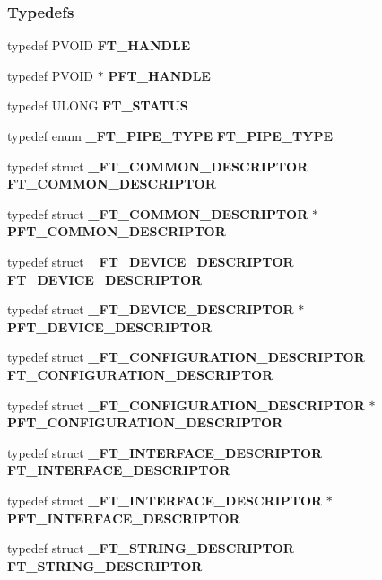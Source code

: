 \subsubsection*{Typedefs}
\begin{DoxyCompactItemize}
\item 
typedef P\+V\+O\+ID {\bf F\+T\+\_\+\+H\+A\+N\+D\+LE}
\item 
typedef P\+V\+O\+ID $\ast$ {\bf P\+F\+T\+\_\+\+H\+A\+N\+D\+LE}
\item 
typedef U\+L\+O\+NG {\bf F\+T\+\_\+\+S\+T\+A\+T\+US}
\item 
typedef enum {\bf \+\_\+\+F\+T\+\_\+\+P\+I\+P\+E\+\_\+\+T\+Y\+PE} {\bf F\+T\+\_\+\+P\+I\+P\+E\+\_\+\+T\+Y\+PE}
\item 
typedef struct {\bf \+\_\+\+F\+T\+\_\+\+C\+O\+M\+M\+O\+N\+\_\+\+D\+E\+S\+C\+R\+I\+P\+T\+OR} {\bf F\+T\+\_\+\+C\+O\+M\+M\+O\+N\+\_\+\+D\+E\+S\+C\+R\+I\+P\+T\+OR}
\item 
typedef struct {\bf \+\_\+\+F\+T\+\_\+\+C\+O\+M\+M\+O\+N\+\_\+\+D\+E\+S\+C\+R\+I\+P\+T\+OR} $\ast$ {\bf P\+F\+T\+\_\+\+C\+O\+M\+M\+O\+N\+\_\+\+D\+E\+S\+C\+R\+I\+P\+T\+OR}
\item 
typedef struct {\bf \+\_\+\+F\+T\+\_\+\+D\+E\+V\+I\+C\+E\+\_\+\+D\+E\+S\+C\+R\+I\+P\+T\+OR} {\bf F\+T\+\_\+\+D\+E\+V\+I\+C\+E\+\_\+\+D\+E\+S\+C\+R\+I\+P\+T\+OR}
\item 
typedef struct {\bf \+\_\+\+F\+T\+\_\+\+D\+E\+V\+I\+C\+E\+\_\+\+D\+E\+S\+C\+R\+I\+P\+T\+OR} $\ast$ {\bf P\+F\+T\+\_\+\+D\+E\+V\+I\+C\+E\+\_\+\+D\+E\+S\+C\+R\+I\+P\+T\+OR}
\item 
typedef struct {\bf \+\_\+\+F\+T\+\_\+\+C\+O\+N\+F\+I\+G\+U\+R\+A\+T\+I\+O\+N\+\_\+\+D\+E\+S\+C\+R\+I\+P\+T\+OR} {\bf F\+T\+\_\+\+C\+O\+N\+F\+I\+G\+U\+R\+A\+T\+I\+O\+N\+\_\+\+D\+E\+S\+C\+R\+I\+P\+T\+OR}
\item 
typedef struct {\bf \+\_\+\+F\+T\+\_\+\+C\+O\+N\+F\+I\+G\+U\+R\+A\+T\+I\+O\+N\+\_\+\+D\+E\+S\+C\+R\+I\+P\+T\+OR} $\ast$ {\bf P\+F\+T\+\_\+\+C\+O\+N\+F\+I\+G\+U\+R\+A\+T\+I\+O\+N\+\_\+\+D\+E\+S\+C\+R\+I\+P\+T\+OR}
\item 
typedef struct {\bf \+\_\+\+F\+T\+\_\+\+I\+N\+T\+E\+R\+F\+A\+C\+E\+\_\+\+D\+E\+S\+C\+R\+I\+P\+T\+OR} {\bf F\+T\+\_\+\+I\+N\+T\+E\+R\+F\+A\+C\+E\+\_\+\+D\+E\+S\+C\+R\+I\+P\+T\+OR}
\item 
typedef struct {\bf \+\_\+\+F\+T\+\_\+\+I\+N\+T\+E\+R\+F\+A\+C\+E\+\_\+\+D\+E\+S\+C\+R\+I\+P\+T\+OR} $\ast$ {\bf P\+F\+T\+\_\+\+I\+N\+T\+E\+R\+F\+A\+C\+E\+\_\+\+D\+E\+S\+C\+R\+I\+P\+T\+OR}
\item 
typedef struct {\bf \+\_\+\+F\+T\+\_\+\+S\+T\+R\+I\+N\+G\+\_\+\+D\+E\+S\+C\+R\+I\+P\+T\+OR} {\bf F\+T\+\_\+\+S\+T\+R\+I\+N\+G\+\_\+\+D\+E\+S\+C\+R\+I\+P\+T\+OR}

\end{DoxyCompactItemize}
